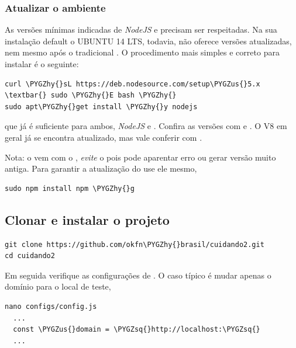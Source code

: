 \documentclass[letterpaper,10pt,english]{sphinxmanual}
\def\PYGZus{\char`\_}
\def\PYGZhy{\char`\-}
\def\PYGZsq{\char`\'}
\renewcommand\PYGZsq{\textquotesingle}
\begin{document}
\subsubsection{Atualizar o ambiente}
\label{install-site:atualizar-o-ambiente}
As versões mínimas indicadas de \emph{NodeJS} e  precisam ser
respeitadas. Na sua instalação default o UBUNTU 14 LTS, todavia, não
oferece versões atualizadas, nem mesmo após o tradicional
. O procedimento mais simples e correto para instalar
é o seguinte:

\begin{Verbatim}[commandchars=\\\{\}]
curl \PYGZhy{}sL https://deb.nodesource.com/setup\PYGZus{}5.x \textbar{} sudo \PYGZhy{}E bash \PYGZhy{}
sudo apt\PYGZhy{}get install \PYGZhy{}y nodejs
\end{Verbatim}

que já é suficiente para ambos, \emph{NodeJS} e . Confira as versões
com  e . O V8 em geral já se encontra
atualizado, mas vale conferir com .

Nota: o  vem com o , \emph{evite} o 
pois pode aparentar erro ou gerar versão muito antiga. Para garantir a
atualização do  use ele mesmo,

\begin{Verbatim}[commandchars=\\\{\}]
sudo npm install npm \PYGZhy{}g
\end{Verbatim}


\subsection{Clonar e instalar o projeto}
\label{install-site:clonar-e-instalar-o-projeto}
\begin{Verbatim}[commandchars=\\\{\}]
git clone https://github.com/okfn\PYGZhy{}brasil/cuidando2.git
cd cuidando2
\end{Verbatim}

Em seguida verifique as configurações de . O caso
típico é mudar apenas o domínio para o local de teste,

\begin{Verbatim}[commandchars=\\\{\}]
nano configs/config.js
  ...
  const \PYGZus{}domain = \PYGZsq{}http://localhost:\PYGZsq{}
  ...
\end{Verbatim}
\end{document}
